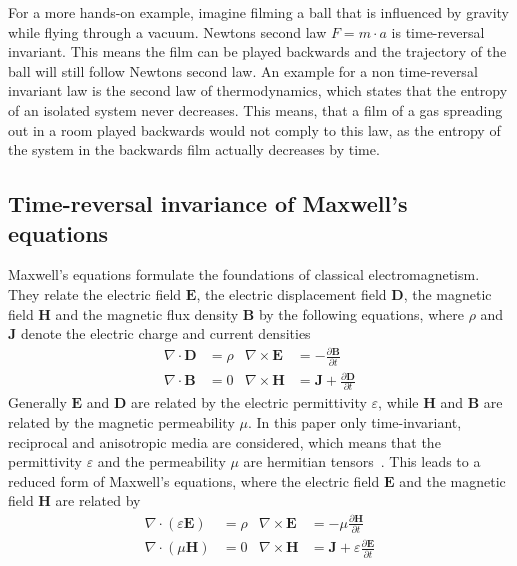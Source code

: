 For a more hands-on example, imagine filming a ball that is influenced by gravity while flying through a vacuum.
Newtons second law \({F}=m \cdot {a}\) is time-reversal invariant. This means the film can be played backwards and the trajectory of the ball will still follow Newtons second law.
An example for a non time-reversal invariant law is the second law of thermodynamics, which states that the entropy of an isolated system never decreases.
This means, that a film of a gas spreading out in a room played backwards would not comply to this law, as the entropy of the system in the backwards film actually decreases by time.



\subsection{Time-reversal invariance of Maxwell's equations}
Maxwell's equations formulate the foundations of classical electromagnetism.
They relate the electric field \(\bm{E}\), the electric displacement field \(\bm{D}\), the magnetic field \(\bm{H}\) and the magnetic flux density \(\bm{B}\)  by the following equations, where \(\rho \) and \({\bm{J}}\) denote the electric charge and current densities
\begin{align}\label{eq:maxwell}
    \nabla \cdot \bm{D} &= \rho & \nabla \times \bm{E} &= -\frac{\partial \bm{B}}{\partial t} \\
    \nabla \cdot \bm{B} &= 0 & \nabla \times \bm{H} &= \bm{J} + \frac{\partial \bm{D}}{\partial t}
\end{align}
Generally \(\bm{E}\) and \(\bm{D}\) are related by the electric permittivity \(\varepsilon \), while \(\bm{H}\) and \(\bm{B}\) are related by the magnetic permeability \(\mu \).
In this paper only time-invariant, reciprocal and anisotropic media are considered, which means that the permittivity \(\varepsilon \) and the permeability \(\mu \) are hermitian tensors~\parencite{krowne_electromagnetic_1984}.
This leads to a reduced form of Maxwell's equations, where the electric field \(\bm{E}\) and the magnetic field \(\bm{H}\) are related by
\begin{align}\label{eq:maxwell_reciprocal}
    \nabla \cdot (\varepsilon \bm{E}) &= \rho & \nabla \times \bm{E} &= -\mu \frac{\partial \bm{H}}{\partial t} \\
    \nabla \cdot (\mu \bm{H}) &= 0 & \nabla \times \bm{H} &= \bm{J} + \varepsilon \frac{\partial \bm{E}}{\partial t}
\end{align}

